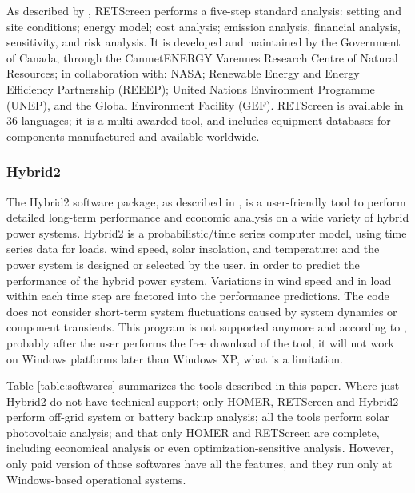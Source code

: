 As described by \cite{Pradhan}, RETScreen performs a five-step standard analysis: setting and site conditions; energy model; cost analysis; emission analysis, financial analysis, sensitivity, and risk analysis. It is developed and maintained by the Government of Canada, through the CanmetENERGY Varennes Research Centre of Natural Resources; in collaboration with: NASA; Renewable Energy and Energy Efficiency Partnership (REEEP); United Nations Environment Programme (UNEP), and the Global Environment Facility (GEF). RETScreen is available in 36 languages; it is a multi-awarded tool, and includes equipment databases for components manufactured and available worldwide.

\subsubsection{Hybrid2}
The Hybrid2 software package, as described in \cite{Mills}, is a user-friendly tool to perform detailed long-term performance and economic analysis on a wide variety of hybrid power systems. Hybrid2 is a probabilistic/time series computer model, using time series data for loads, wind speed, solar insolation, and temperature; and the power system is designed or selected by the user, in order to predict the performance of the hybrid power system. Variations in wind speed and in load within each time step are factored into the performance predictions. The code does not consider short-term system fluctuations caused by system dynamics or component transients. This program is not supported anymore and according to \cite{UMASS}, probably after the user performs the free download of the tool, it will not work on Windows platforms later than Windows XP, what is a limitation.

Table \ref{table:softwares} summarizes the tools described in this paper.  Where just Hybrid2 do not have technical support; only HOMER, RETScreen and Hybrid2 perform off-grid system or battery backup analysis; all the tools perform solar photovoltaic analysis; and that only HOMER and RETScreen are complete, including economical analysis or even optimization-sensitive analysis. However, only paid version of those softwares have all the features, and they run only at Windows-based operational systems.

